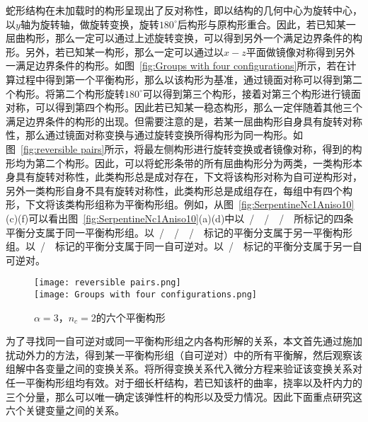 蛇形结构在未加载时的构形呈现出了反对称性，即以结构的几何中心为旋转中心，以$y$轴为旋转轴，做旋转变换，旋转$180^\circ$后构形与原构形重合。因此，若已知某一屈曲构形，那么一定可以通过上述旋转变换，可以得到另外一个满足边界条件的构形。另外，若已知某一构形，那么一定可以通过以$x-z$平面做镜像对称得到另外一满足边界条件的构形。如图~\ref{fig:Groups with four configurations}所示，若在计算过程中得到第一个平衡构形，那么以该构形为基准，通过镜面对称可以得到第二个构形。将第二个构形旋转$180^\circ$可以得到第三个构形，接着对第三个构形进行镜面对称，可以得到第四个构形。因此若已知某一稳态构形，那么一定伴随着其他三个满足边界条件的构形的出现。但需要注意的是，若某一屈曲构形自身具有旋转对称性，那么通过镜面对称变换与通过旋转变换所得构形为同一构形。如图~\ref{fig:reversible pairs}所示，将最左侧构形进行旋转变换或者镜像对称，得到的构形均为第二个构形。因此，可以将蛇形条带的所有屈曲构形分为两类，一类构形本身具有旋转对称性，此类构形总是成对存在，下文将该构形对称为自可逆构形对，另外一类构形自身不具有旋转对称性，此类构形总是成组存在，每组中有四个构形，下文将该类构形组称为平衡构形组。例如，从图~\ref{fig:SerpentineNc1Aniso10}(c)(f)可以看出图~\ref{fig:SerpentineNc1Aniso10}(a)(d)中以~\Brighttriangle/~\Blefttriangle~/~\Rlefttriangle~/~\Rrighttriangle~所标记的四条平衡分支属于同一平衡构形组。以~\HBrighttriangle/~\HBlefttriangle~/~\HRlefttriangle~/~\HRrighttriangle~标记的平衡分支属于另一平衡构形组。以~\bluesquare/~\redsquare~标记的平衡分支属于同一自可逆对。以~\Btriangle/~\Rtriangle~标记的平衡分支属于另一自可逆对。
\begin{figure}
	\centering
	{\texttt{[image: reversible pairs.png]}}\\
	{\texttt{[image: Groups with four configurations.png]}}
	\caption{$\alpha=3$，$n_c=2$的六个平衡构形}
	\label{fig:reversible pairs and group}
\end{figure}

为了寻找同一自可逆对或同一平衡构形组之内各构形解的关系，本文首先通过施加扰动外力的方法，得到某一平衡构形组（自可逆对）中的所有平衡解，然后观察该组解中各变量之间的变换关系。将所得变换关系代入微分方程来验证该变换关系对任一平衡构形组均有效。对于细长杆结构，若已知该杆的曲率，挠率以及杆内力的三个分量，那么可以唯一确定该弹性杆的构形以及受力情况。因此下面重点研究这六个关键变量之间的关系。

